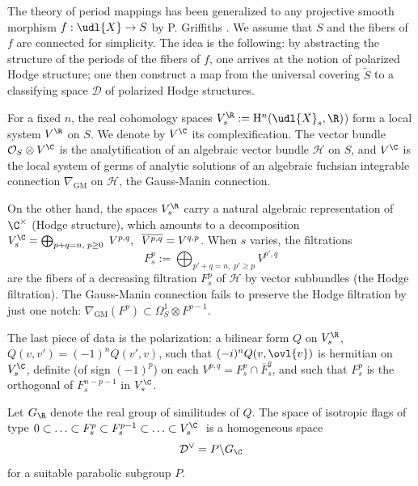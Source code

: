 \begin{para}\label{para:1.2.3}
 The theory of period mappings has been generalized to any projective
 smooth morphism $f:\udl{X}\rightarrow S$ by P. Griffiths
 \cite{poioam3}.  We assume that $S$ and the fibers of $f$ are connected for
 simplicity.  The idea is the following: by abstracting the structure of
 the periods of the fibers of $f$, one arrives at the notion of
 polarized Hodge structure; one then construct a map from the universal
 covering $\tilde S$ to a classifying space $\mathcal{D}$ of polarized
 Hodge structures.

 For a fixed $n$, the real cohomology spaces
 $V_s^{\R}:= \mathrm{H}^n(\udl{X}_s,{\R})$) form a local system $V^{\R}$
 on $S$. We denote by $V^{\C}$ its complexification. The vector bundle
 $\mathcal{O}_S\otimes V^{\C}$ is the analytification of an algebraic
 vector bundle $\mathcal{H}$ on $S$, and $V^{\C}$ is the local system of
 germs of analytic solutions of an algebraic fuchsian integrable
 connection $\nabla_{\mathrm{GM}}$ on $\mathcal{H}$, the Gauss-Manin
 connection.

 On the other hand, the spaces $V_s^{\R}$ carry a natural algebraic
 representation of ${\C}^\times$ (Hodge structure), which amounts to a
 decomposition $V_s^{\C}=\bigoplus_{p+q=n,\;p\geq 0}
 \;V^{p,q},\;\;\overline{V^{p,q}}=V^{q,p}$. When $s$ varies, the
 filtrations
 \begin{equation*}
  F_s^p:=\bigoplus_{p'+q=n,\;p'\geq p} V^{p',q}
 \end{equation*}
 are the fibers of a decreasing filtration $F_s^p$ of $\mathcal{H}$ by
 vector subbundles (the Hodge filtration). The Gauss-Manin connection
 fails to preserve the Hodge filtration by just one notch:
 $\nabla_{\mathrm{GM}}(F^p)\subset \Omega^1_S\otimes F^{p-1}$.


 The last piece of data is the polarization: a bilinear form $Q$ on
 $V_s^{\R}$, $Q(v,v')=(-1)^nQ(v',v)$, such that $(-i)^nQ(v,\ovl{v})$ is
 hermitian on $V_s^{\C}$, definite (of sign $(-1)^p$) on each
 $V^{p,q}=F_s^p\cap \overline F_s^q$, and such that $F_s^p$ is the
 orthogonal of $F_s^{n-p-1}$ in $V_s^{\C}$.
 
 Let $G_{\R}$ denote the real group of similitudes of $Q$. The
 space of isotropic flags of type $0\subset \ldots \subset F_s^p\subset
 F_s^{p-1}\subset \ldots \subset V_s^{\C} \;$ is a homogeneous space
 \begin{equation*}
  \mathcal{D}^\vee = P\backslash G_{\C}
 \end{equation*}
 for a suitable parabolic subgroup $P$.  
 


\end{para}
